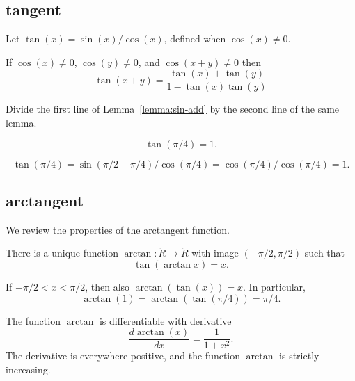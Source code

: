 \subsection{tangent}
\label{sec:tangent}

\begin{definition}[tangent]\label{def:tan}
Let $\tan(x) = \sin(x)/\cos(x)$, defined when $\cos(x)\ne0$.
\end{definition}


\begin{lemma}\label{lemma:tan-add}
    If $\cos(x)\ne 0$, $\cos(y)\ne 0$, and $\cos(x+y)\ne0$ then
    $$\tan(x+y) = \frac{\tan(x) + \tan(y) }{ 1 - \tan(x)\tan(y)}$$
\end{lemma}

\begin{proved}
  Divide the first line of Lemma~\ref{lemma:sin-add} by the second
  line of the same lemma.
\swallowed\end{proved}

\begin{lemma}\label{lemma:tan-pi4}
    $$\tan(\pi/4) = 1.$$
\end{lemma}

\begin{proved}
    $$\tan(\pi/4) = \sin(\pi/2-\pi/4)/\cos(\pi/4) =
    \cos(\pi/4)/\cos(\pi/4) = 1.$$
\swallowed\end{proved}


\subsection{arctangent}

We review the properties of the arctangent function.

\begin{definition}[arctangent]\label{def:arctan}
There is a unique function $\arctan:\ring{R}\to\ring{R}$ with
image $(-\pi/2,\pi/2)$ such that
    $$\tan(\arctan x) =x.$$
\end{definition}

If $-\pi/2 < x < \pi/2$, then also $\arctan(\tan(x)) = x$. In
particular,
    $$\arctan(1) = \arctan(\tan(\pi/4)) = \pi/4.$$


The function $\arctan$ is differentiable with derivative%
    $$\frac{d \arctan(x)}{dx} = \frac{1}{1 + x^2}.$$
The derivative is everywhere positive, and the function $\arctan$ is
strictly increasing.


